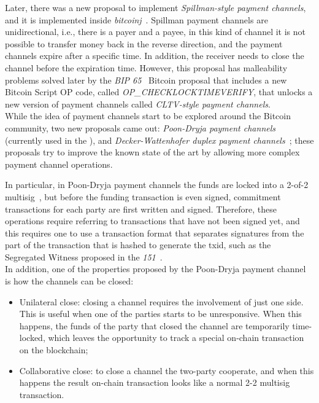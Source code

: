 Later, there was a new proposal to implement  \emph{Spillman-style payment channels}, and it is
implemented inside  \emph{bitcoinj}~\cite{bitcoinj-impl}. Spillman payment channels are unidirectional, i.e., 
there is a payer and a payee, in this kind of channel it is not possible to transfer money back in the reverse direction, and the payment
channels expire after a specific time.
In addition, the receiver needs to close the channel before the expiration time.
However, this proposal has malleability problems solved later by the \emph{BIP  65}~\cite{bip65} Bitcoin proposal that includes a new Bitcoin Script OP code,
called \emph{OP\_CHECKLOCKTIMEVERIFY}, that unlocks a new version of payment channels called \emph{CLTV-style payment channels}.\\
While the idea of payment channels start to be explored around the Bitcoin community, two new proposals came out:
\emph{Poon-Dryja payment channels}~\cite{lightning-network-paper} (currently used in the {\LN}),
and \emph{Decker-Wattenhofer duplex payment channels}~\cite{Decker2015fast}; these proposals try to improve the known state
of the art by allowing more complex payment channel operations.

In particular, in Poon-Dryja payment channels the funds are locked into a 2-of-2 multisig~\cite{Palazzo_Estrazione_di_Informazioni_2021},
but before the funding transaction is even signed, commitment transactions for each party are first written and signed.
Therefore, these operations require referring to transactions that have not been signed yet, and this requires one to use a transaction
 format that separates signatures from the part of the transaction that is hashed to generate the txid, such as the Segregated Witness proposed  in the \emph{151}~\cite{bip141}.\\
In addition, one of the properties proposed by the Poon-Dryja payment channel is how the channels can be closed:

\begin{itemize}
  \item Unilateral close: closing a channel requires the involvement of just one side. This is useful when one
        of the parties starts to be unresponsive. When this happens, the funds of
        the party that closed the channel are temporarily time-locked, which leaves the opportunity to
        track a special on-chain transaction on the blockchain;
  \item Collaborative close: to close a channel the two-party cooperate, and when this happens the result
        on-chain transaction looks like a normal 2-2 multisig transaction.
\end{itemize}

